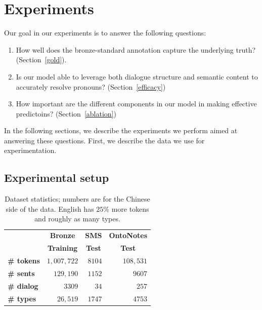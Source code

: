 \documentclass[11pt]{report}
\begin{document}
\section{Experiments} \label{experiments}

Our goal in our experiments is to answer the following questions:

\begin{enumerate} \itemsep1pt \parskip0pt 
\item How well does the bronze-standard annotation capture the underlying truth? (Section~\ref{gold}).
\item Is our model able to leverage both dialogue structure and semantic content to accurately resolve pronouns? (Section~\ref{efficacy})
\item How important are the different components in our model in making effective predictoins? (Section~\ref{ablation})
\end{enumerate}

In the following sections, we describe the experiments we perform aimed at answering these questions. First, we describe the data we use for experimentation.

\subsection{Experimental setup} \label{setup}

\begin{table}[t]
\begin{footnotesize}
\begin{center}
\begin{tabular}{|l|r|r|r|}
\hline
&
\multicolumn{1}{c|}{\bf Bronze} &
\multicolumn{1}{c|}{\bf SMS} &
\multicolumn{1}{c|}{\bf OntoNotes} \\
&
\multicolumn{1}{c|}{\bf Training} &
\multicolumn{1}{c|}{\bf Test} &
\multicolumn{1}{c|}{\bf Test} \\
\hline
\bf \# tokens & $1,007,722$ & $8104$ & $108,531$ \\ \hline
\bf \# sents  & $129,190$ & $1152$ & $9607$ \\ \hline
\bf \# dialog & $3309$ & $34$ & $257$ \\ \hline
\bf \# types  & $26,519$ & $1747$ & $4753$ \\ \hline
\end{tabular}
\end{center}
\end{footnotesize}
\caption{\label{dataset-numbers} Dataset statistics; numbers are for the Chinese side of the data. English has $25\%$ more tokens and roughly as many types.}
\end{table}
\end{document}
